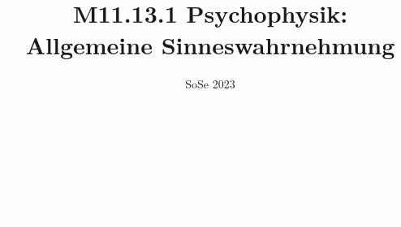 \documentclass{beamer}
\title[M11.13.1 Psychophysik]{M11.13.1 Psychophysik: \\ Allgemeine Sinneswahrnehmung}
\author[melanie.stefan@medicalschool-berlin.de]{}
\institute[]{Prof. Melanie Stefan \\ melanie.stefan@medicalschool-berlin.de}
\date{SoSe 2023}
\begin{document}
{  
\begin{frame}

 \maketitle 

$\,$\\[6cm] 


\end{frame} 
}



{  
\begin{frame}
\textcolor{white}{Wir nehmen die Welt durch unsere Sinne wahr \dots}

$\,$\\[3.5cm]


\textcolor{white}{Aber wie?}

$\,$\\[4cm]

\end{frame}
}
\end{document}
